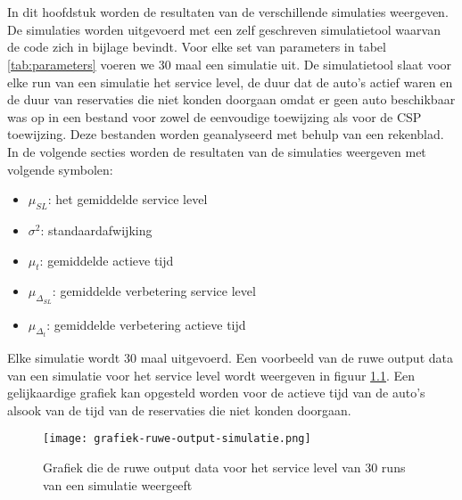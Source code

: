\chapter{}
\label{ch:resultaten-simulaties}
In dit hoofdstuk worden de resultaten van de verschillende simulaties weergeven. De simulaties worden uitgevoerd met een zelf geschreven simulatietool waarvan de code zich in bijlage bevindt. Voor elke set van parameters in tabel \ref{tab:parameters} voeren we 30 maal een simulatie uit. De simulatietool slaat voor elke run van een simulatie het service level, de duur dat de auto's actief waren en de duur van reservaties die niet konden doorgaan omdat er geen auto beschikbaar was op in een bestand voor zowel de eenvoudige toewijzing als voor de CSP toewijzing. Deze bestanden worden geanalyseerd met behulp van een rekenblad.
In de volgende secties worden de resultaten van de simulaties weergeven met volgende symbolen:
\begin{itemize}
	\item $\mu_{ SL}$: het gemiddelde service level
	\item $\sigma^2$: standaardafwijking
	\item $\mu_{ t}$: gemiddelde actieve tijd
	\item $\mu_{\Delta_{ SL}}$: gemiddelde verbetering service level
	\item $\mu_{\Delta_{ t}}$: gemiddelde verbetering actieve tijd
\end{itemize}
Elke simulatie wordt 30 maal uitgevoerd. Een voorbeeld van de ruwe output data van een simulatie voor het service level wordt weergeven in figuur \ref{grafiek:ruwe-output-simulatie}. Een gelijkaardige grafiek kan opgesteld worden voor de actieve tijd van de auto's alsook van de tijd van de reservaties die niet konden doorgaan.
\begin{figure}[h]
	\texttt{[image: grafiek-ruwe-output-simulatie.png]}
	\caption[Grafiek die de ruwe output data voor het service level van 30 runs van een simulatie weergeeft]{Grafiek die de ruwe output data voor het service level van 30 runs van een simulatie weergeeft}
	\label{grafiek:ruwe-output-simulatie}
\end{figure}

